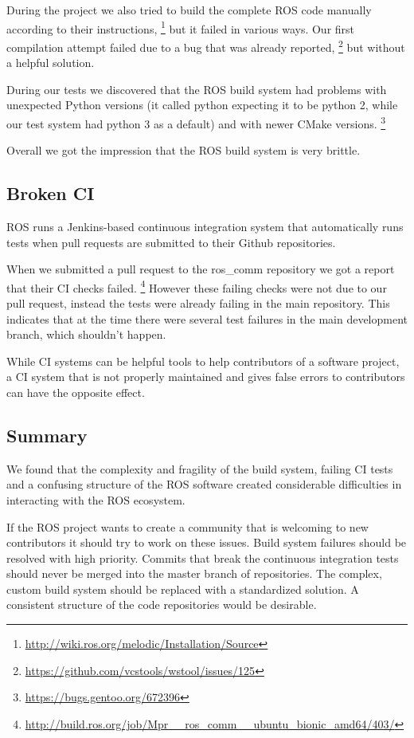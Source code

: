 \documentclass{article}
\begin{document}
During the project we also tried to build the complete ROS code manually according
to their instructions,
\footnote{\url{http://wiki.ros.org/melodic/Installation/Source}} but it failed
in various ways. Our first compilation attempt failed due to a bug that was already reported,
\footnote{\url{https://github.com/vcstools/wstool/issues/125}} but without a helpful solution.

During our tests we discovered that the ROS build system had problems with unexpected Python versions
(it called python expecting it to be python 2, while our test system had python 3 as a default) and
with newer CMake versions. \footnote{\url{https://bugs.gentoo.org/672396}}

Overall we got the impression that the ROS build system is very brittle.

\subsection{Broken CI}

ROS runs a Jenkins-based continuous integration system that automatically runs tests when pull requests
are submitted to their Github repositories.

When we submitted a pull request to the ros\_comm repository we got a report that their CI checks
failed. \footnote{\url{http://build.ros.org/job/Mpr__ros_comm__ubuntu_bionic_amd64/403/}} However these
failing checks were not due to our pull request, instead the tests were already failing in the main repository.
This indicates that at the time there were several test failures in the main development branch, which
shouldn't happen.

While CI systems can be helpful tools to help contributors of a software project, a
CI system that is not properly maintained and gives false errors to contributors can have the
opposite effect.

\subsection{Summary}

We found that
the complexity and fragility of the build system, failing CI tests and a confusing structure of the
ROS software created considerable difficulties in interacting with the ROS ecosystem.

If the ROS project wants to create a community that is welcoming to new contributors it should try
to work on these issues. Build system failures should be resolved with high priority. Commits that
break the continuous integration tests should never be merged into the master branch of repositories.
The complex, custom build system should be replaced with a standardized solution. A consistent structure
of the code repositories would be desirable.
\end{document}
